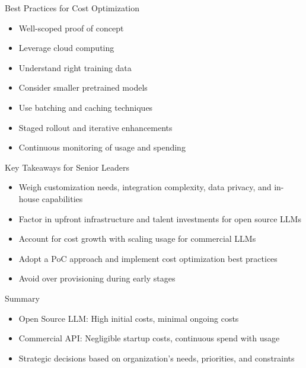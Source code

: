 \begin{frame}[fragile]{Best Practices for Cost Optimization}
  \begin{itemize}
    \item Well-scoped proof of concept
    \item Leverage cloud computing
    \item Understand right training data
    \item Consider smaller pretrained models
    \item Use batching and caching techniques
    \item Staged rollout and iterative enhancements
    \item Continuous monitoring of usage and spending
  \end{itemize}
\end{frame}

\begin{frame}[fragile]{Key Takeaways for Senior Leaders}
  \begin{itemize}
    \item Weigh customization needs, integration complexity, data privacy, and in-house capabilities
    \item Factor in upfront infrastructure and talent investments for open source LLMs
    \item Account for cost growth with scaling usage for commercial LLMs
    \item Adopt a PoC approach and implement cost optimization best practices
    \item Avoid over provisioning during early stages
  \end{itemize}
\end{frame}

\begin{frame}[fragile]{Summary}
  \begin{itemize}
    \item Open Source LLM: High initial costs, minimal ongoing costs
    \item Commercial API: Negligible startup costs, continuous spend with usage
    \item Strategic decisions based on organization's needs, priorities, and constraints
  \end{itemize}
\end{frame}

